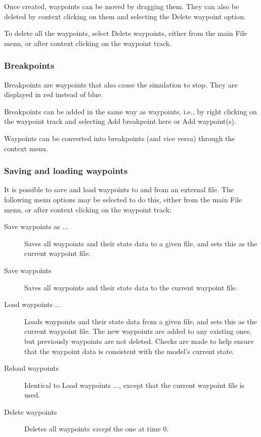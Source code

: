 \documentclass{article}
\begin{document}
Once created, waypoints can be moved by dragging them. They can also
be deleted by context clicking on them and selecting the {\sf Delete waypoint}
option.

To delete all the waypoints, select {\sf Delete waypoints}, either
from the main {\sf File} menu, or after context clicking on the waypoint
track.

\subsubsection{Breakpoints}

Breakpoints are waypoints that also cause the simulation to stop.
They are displayed in red instead of blue.

Breakpoints can be added in the same way as waypoints, i.e., by right
clicking on the waypoint track and selecting {\sf Add breakpoint here} or
{\sf Add waypoint(s)}.

Waypoints can be converted into breakpoints (and vice versa) through
the context menu.

\subsubsection{Saving and loading waypoints}

It is possible to save and load waypoints to and from an external
file. The following menu options may be selected to do this, either
from the main {\sf File} menu, or after context clicking on the waypoint
track:

\begin{description}

\item[Save waypoints as ...] \mbox{}

Saves all waypoints and their state data to a given file, and sets
this as the current waypoint file.

\item[Save waypoints] \mbox{}

Saves all waypoints and their state data to the current waypoint file.

\item[Load waypoints ...] \mbox{}

Loads waypoints and their state data from a given file, and sets this
as the current waypoint file.  The new waypoints are added to any
existing ones, but previously waypoints are not deleted. Checks
are made to help ensure that the waypoint data is consistent with the
model's current state.

\item[Reload waypoints] \mbox{}

Identical to {\sf Load waypoints ...}, except that the current
waypoint file is used.

\item[Delete waypoints] \mbox{}

Deletes all waypoints {\it except} the one at time 0.

\end{description}
\end{document}
